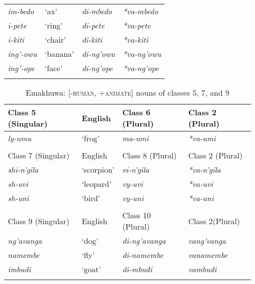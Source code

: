 \documentclass[output=paper]{langsci/langscibook}
\begin{document}
\begin{table}
\begin{tabularx}{\textwidth}{XXXX}
 {\textit{im-bedo}}&   {‘ax’}   & {\textit{di-mbedo}} &  {\textit{*va-mbedo}} \\

 \textit{i-pete}     & ‘ring’   & \textit{di-pete}   &   \textit{*va-pete}   \\

 \textit{i-kiti}     & ‘chair’  & \textit{di-kiti}   &   \textit{*va-kiti}   \\

 \textit{ing’-owu}   & ‘banana’ & \textit{di-ng’owu} &   \textit{*va-ng’owu} \\

 \textit{ing’-ope}   & ‘face’   & \textit{di-ng’ope} &   \textit{*va-ng’ope}\\
 
\lspbottomrule
\end{tabularx}
\end{table}


\begin{table}

\caption{Emakhuwa: [\textsc{-human}, \textsc{+animate}] nouns of classes 5, 7, and 9}
\label{tab:nguna:2}


\begin{tabularx}{\textwidth}{XXXX}
\lsptoprule
 Class 5  (Singular)& English& Class 6  (Plural)& Class 2  (Plural)\\
 \midrule 
 
 \textit{ly-umu}& ‘frog’& \textit{ma-umi}& \textit{*va-umi}\\
 \\
 
 Class 7 (Singular)& English& Class 8 (Plural)& Class 2 (Plural)\\
 \midrule 
 \textit{shi-n’gila}  & ‘scorpion’ & \textit{vi-n’gila} & \textit{*va-n’gila}\\

 \textit{sh-uvi}  & ‘leopard’ & \textit{vy-uvi} & \textit{*va-uvi}\\

 \textit{sh-uni}& ‘bird’ & \textit{vy-uni}& \textit{*va-uni}\\

 \\
{Class 9} {(Singular)} & {English} & {Class 10} {(Plural)} & {Class 2}{(Plural)}\\
\midrule 

 \textit{ng’avanga} & ‘dog’ & \textit{di-ng’avanga} &\textit{vang’vanga}\\

 \textit{namembe} & ‘fly’ & \textit{di-namembe} & \textit{vanamembe} \\

 \textit{imbudi} &‘goat’ & \textit{di-mbudi}&     \textit{vambudi}\\
\lspbottomrule
\end{tabularx}

\end{table}
\end{document}
